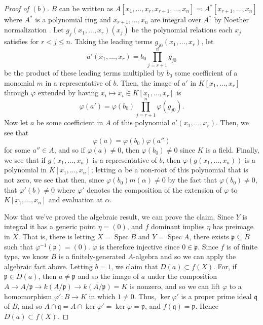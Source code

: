 \documentclass[12pt,letterpaper]{article}
\theoremstyle{definition}
\theoremstyle{remark}
\numberwithin{equation}{section}
\numberwithin{figure}{problem}
\DeclareMathOperator{\Spec}{Spec}
\begin{document}
\begin{proof}[Proof of $(b)$]
  $B$ can be written as $A[x_1,\ldots,x_r,x_{r+1},\ldots,x_n] \eqqcolon A^*[x_{r+1},\ldots,x_n]$ where $A^*$ is a polynomial ring and $x_{r+1},\ldots,x_n$ are integral over $A^*$ by Noether normalization \cite[14.G]{Mat70}. Let $g_j(x_1,\ldots,x_r)(x_j)$ be the polynomial relations each $x_j$ satisfies for $r < j \le n$. Taking the leading terms $g_{j0}(x_1,\ldots,x_r)$, let
  \begin{equation*}
    a'(x_1,\ldots,x_r) = b_0\prod_{j=r+1}^n g_{j0}
  \end{equation*}
  be the product of these leading terms multiplied by $b_0$ some coefficient of a monomial $m$ in a representative of $b$. Then, the image of $a'$ in $K[x_1,\ldots,x_r]$ through $\varphi$ extended by having $x_i \mapsto x_i \in K[x_1,\ldots,x_r]$ is
  \begin{equation*}
    \varphi(a') = \varphi(b_0)\prod_{j=r+1}^n \varphi(g_{j0}).
  \end{equation*}
  Now let $a$ be some coefficient in $A$ of this polynomial $a'(x_1,\ldots,x_r)$. Then, we see that
  \begin{equation*}
    \varphi(a) = \varphi(b_0)\varphi(a'')
  \end{equation*}
  for some $a'' \in A$, and so if $\varphi(a) \ne 0$, then $\varphi(b_0) \ne 0$ since $K$ is a field. Finally, we see that if $g(x_1,\ldots,x_n)$ is a representative of $b$, then $\varphi(g(x_1,\ldots,x_n))$ is a polynomial in $K[x_1,\ldots,x_n]$; letting $\alpha$ be a non-root of this polynomial that is not zero, we see that then, since $\varphi(b_0)m(\alpha) \ne 0$ by the fact that $\varphi(b_0) \ne 0$, that $\varphi'(b) \ne 0$ where $\varphi'$ denotes the composition of the extension of $\varphi$ to $K[x_1,\ldots,x_n]$ and evaluation at $\alpha$.
  \par Now that we've proved the algebraic result, we can prove the claim. Since $Y$ is integral it has a generic point $\eta = (0)$, and $f$ dominant implies $\eta$ has preimage in $X$. That is, there is letting $X = \Spec B$ and $Y = \Spec A$, there exists $\mathfrak{p} \subseteq B$ such that $\varphi^{-1}(\mathfrak{p}) = (0)$. $\varphi$ is therefore injective since $0 \in \mathfrak{p}$. Since $f$ is of finite type, we know $B$ is a finitely-generated $A$-algebra and so we can apply the algebraic fact above. Letting $b=1$, we claim that $D(a) \subset f(X)$. For, if $\mathfrak{p} \in D(a)$, then $a \ne \mathfrak{p}$ and so the image of $a$ under the composition $A \to A/\mathfrak{p} \to k(A/\mathfrak{p}) \to \overline{k(A/\mathfrak{p})} = K$ is nonzero, and so we can lift $\varphi$ to a homomorphism $\varphi'\colon B \to K$ in which $1 \ne 0$. Thus, $\ker\varphi'$ is a proper prime ideal $\mathfrak{q}$ of $B$, and so $A \cap \mathfrak{q}  =A \cap \ker\varphi' = \ker\varphi = \mathfrak{p}$, and $f(\mathfrak{q}) = \mathfrak{p}$. Hence $D(a) \subset f(X)$.
\end{proof}
\end{document}
